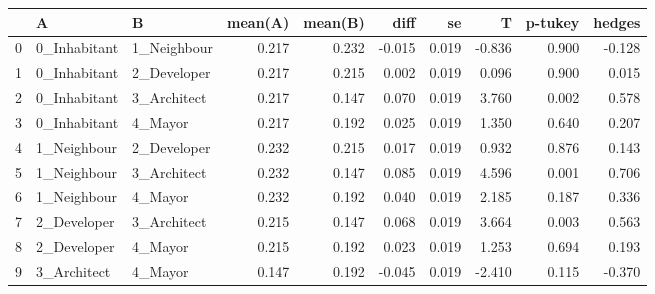 \begin{tabular}{lllrrrrrrr}
\toprule
{} &             A &            B &  mean(A) &  mean(B) &   diff &     se &      T &  p-tukey &  hedges \\
\midrule
0 &  0\_Inhabitant &  1\_Neighbour &    0.217 &    0.232 & -0.015 &  0.019 & -0.836 &    0.900 &  -0.128 \\
1 &  0\_Inhabitant &  2\_Developer &    0.217 &    0.215 &  0.002 &  0.019 &  0.096 &    0.900 &   0.015 \\
2 &  0\_Inhabitant &  3\_Architect &    0.217 &    0.147 &  0.070 &  0.019 &  3.760 &    0.002 &   0.578 \\
3 &  0\_Inhabitant &      4\_Mayor &    0.217 &    0.192 &  0.025 &  0.019 &  1.350 &    0.640 &   0.207 \\
4 &   1\_Neighbour &  2\_Developer &    0.232 &    0.215 &  0.017 &  0.019 &  0.932 &    0.876 &   0.143 \\
5 &   1\_Neighbour &  3\_Architect &    0.232 &    0.147 &  0.085 &  0.019 &  4.596 &    0.001 &   0.706 \\
6 &   1\_Neighbour &      4\_Mayor &    0.232 &    0.192 &  0.040 &  0.019 &  2.185 &    0.187 &   0.336 \\
7 &   2\_Developer &  3\_Architect &    0.215 &    0.147 &  0.068 &  0.019 &  3.664 &    0.003 &   0.563 \\
8 &   2\_Developer &      4\_Mayor &    0.215 &    0.192 &  0.023 &  0.019 &  1.253 &    0.694 &   0.193 \\
9 &   3\_Architect &      4\_Mayor &    0.147 &    0.192 & -0.045 &  0.019 & -2.410 &    0.115 &  -0.370 \\
\bottomrule
\end{tabular}
